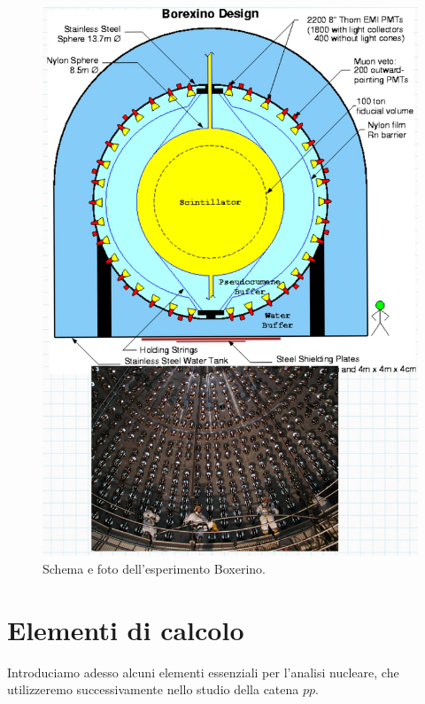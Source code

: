 \begin{itemize}
\begin{figure}[p!h]
        \centering
        \includegraphics[scale=0.2]{Immagini/0322_borexino.png}
        \caption{Schema e foto dell'esperimento Boxerino.}
        \label{0322_box}
    \end{figure}
\end{itemize}

\newpage

\section{Elementi di calcolo}
Introduciamo adesso alcuni elementi essenziali per l'analisi nucleare, che utilizzeremo successivamente nello studio della catena $pp$.

